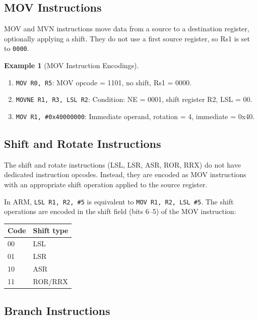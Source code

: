 \documentclass[11pt, a4paper, notitlepage]{report}
\theoremstyle{definition}
\theoremstyle{remark}
\theoremstyle{definition}
\newtheorem{example}[theorem]{Example}
\begin{document}
\subsection{MOV Instructions}

MOV and MVN instructions move data from a source to a destination register, optionally applying a shift. They do not use a first source register, so Rs1 is set to \texttt{0000}.

\begin{example}[MOV Instruction Encodings]
\leavevmode
\begin{enumerate}
  \item \texttt{MOV R0, R5}: MOV opcode = 1101, no shift, Rs1 = 0000.
  \item \texttt{MOVNE R1, R3, LSL R2}: Condition: NE = 0001, shift register R2, LSL = 00.
  \item \texttt{MOV R1, \#0x40000000}: Immediate operand, rotation = 4, immediate = 0x40.
\end{enumerate}
\end{example}

\subsection{Shift and Rotate Instructions}

The shift and rotate instructions (LSL, LSR, ASR, ROR, RRX) do not have dedicated instruction opcodes. Instead, they are encoded as MOV instructions with an appropriate shift operation applied to the source register.

\begin{keyresult}[title={Shift Instructions as MOV}]
In ARM, \texttt{LSL R1, R2, \#5} is equivalent to \texttt{MOV R1, R2, LSL \#5}. The shift operations are encoded in the shift field (bits 6--5) of the MOV instruction:

\begin{center}
\begin{tabular}{ll}
\toprule
\textbf{Code} & \textbf{Shift type} \\
\midrule
00 & LSL \\
01 & LSR \\
10 & ASR \\
11 & ROR/RRX \\
\bottomrule
\end{tabular}
\end{center}
\end{keyresult}

\subsection{Branch Instructions}
\end{document}
